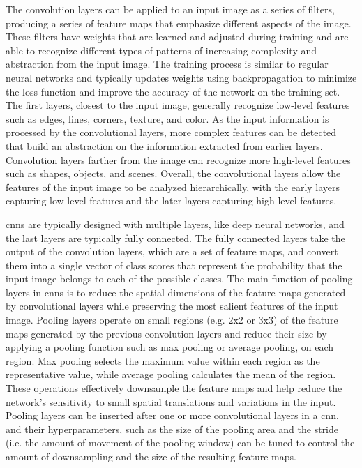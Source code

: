     The convolution layers can be applied to an input image as a series of filters, producing a series of feature maps that emphasize different aspects of the image. These filters have weights that are learned and adjusted during training and are able to recognize different types of patterns of increasing complexity and abstraction from the input image. The training process is similar to regular neural networks and typically updates weights using backpropagation to minimize the loss function and improve the accuracy of the network on the training set. The first layers, closest to the input image, generally recognize low-level features such as edges, lines, corners, texture, and color. As the input information is processed by the convolutional layers, more complex features can be detected that build an abstraction on the information extracted from earlier layers. Convolution layers farther from the image can recognize more high-level features such as shapes, objects, and scenes. Overall, the convolutional layers allow the features of the input image to be analyzed hierarchically, with the early layers capturing low-level features and the later layers capturing high-level features.
    
    \glspl{cnn} are typically designed with multiple layers, like deep neural networks, and the last layers are typically fully connected. The fully connected layers take the output of the convolution layers, which are a set of feature maps, and convert them into a single vector of class scores that represent the probability that the input image belongs to each of the possible classes. The main function of pooling layers in \glspl{cnn} is to reduce the spatial dimensions of the feature maps generated by convolutional layers while preserving the most salient features of the input image. Pooling layers operate on small regions (e.g. 2x2 or 3x3) of the feature maps generated by the previous convolution layers and reduce their size by applying a pooling function such as max pooling or average pooling, on each region. Max pooling selects the maximum value within each region as the representative value, while average pooling calculates the mean of the region. These operations effectively downsample the feature maps and help reduce the network's sensitivity to small spatial translations and variations in the input. Pooling layers can be inserted after one or more convolutional layers in a \gls{cnn}, and their hyperparameters, such as the size of the pooling area and the stride (i.e. the amount of movement of the pooling window) can be tuned to control the amount of downsampling and the size of the resulting feature maps.
    

